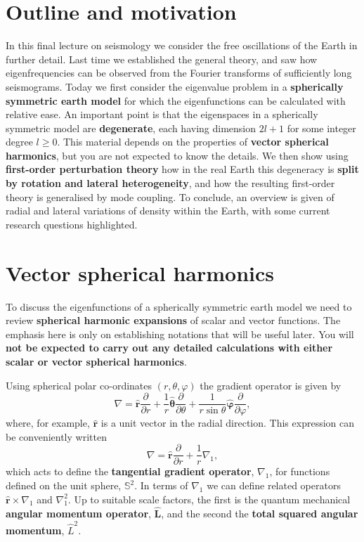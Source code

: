 \section*{Outline and motivation}
In this final lecture on seismology we consider the free oscillations of the Earth in further detail. Last time we established the 
general theory, and saw how eigenfrequencies can be observed from the Fourier transforms of sufficiently long seismograms. Today we 
first consider the eigenvalue problem in a \textbf{spherically symmetric earth model} for which the eigenfunctions can be calculated 
with relative ease. An important point is that the eigenspaces in a spherically symmetric model are \textbf{degenerate}, each having 
dimension $2l+1$ for some integer degree $l\ge0$. This material depends on the properties of \textbf{vector spherical harmonics}, but 
you are not expected to know the details. We then show using \textbf{first-order perturbation theory} how in the real Earth this degeneracy 
is \textbf{split by rotation and lateral heterogeneity}, and how the resulting first-order theory is generalised by mode coupling. To conclude, an overview is given of radial and lateral variations of density 
within the Earth, with some current research questions highlighted.

\section*{Vector spherical harmonics}
To discuss the eigenfunctions of a spherically symmetric earth model we need to review \textbf{spherical harmonic expansions}
 of scalar and vector functions. The emphasis here is only on establishing notations that will be useful later. You will 
 \textbf{not be expected to carry out any detailed calculations with either scalar or vector spherical harmonics}.

Using spherical polar co-ordinates $(r, \theta, \varphi)$ the gradient operator is given by
\begin{equation}\label{eq:1}
\nabla=\hat{\mathbf{r}}\frac{\partial}{\partial r}+\frac{1}{r}\hat{\bm{\theta}}\frac{\partial}{\partial\theta}+\frac{1}{r\sin\theta}\hat{\bm{\varphi}}\frac{\partial}{\partial\varphi},
\end{equation}
where, for example, $\hat{\mathbf{r}}$ is a unit vector in the radial direction. This expression can be conveniently written
\begin{equation}\label{eq:2}
\nabla=\hat{\mathbf{r}}\frac{\partial}{\partial r}+\frac{1}{r}\nabla_{1},
\end{equation}
which acts to define the \textbf{tangential gradient operator}, $\nabla_{1}$, for functions defined on the unit sphere, $\mathbb{S}^{2}$. 
In terms of $\nabla_{1}$ we can define related operators $\hat{\mathbf{r}}\times\nabla_{1}$ and $\nabla_{1}^{2}$. Up to suitable scale factors, the first
 is the quantum mechanical \textbf{angular momentum operator}, $\hat{\mathbf{L}}$, and the second the \textbf{total squared angular momentum}, $\hat{L}^{2}$.

